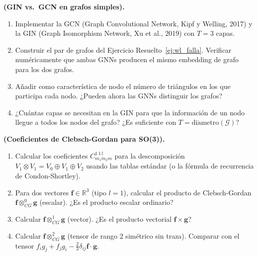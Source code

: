 \begin{ejercicio}
\textbf{(GIN vs.\ GCN en grafos simples).}
\begin{enumerate}[label=(\alph*)]
  \item Implementar la GCN (Graph Convolutional Network, Kipf y Welling, 2017)
        y la GIN (Graph Isomorphism Network, Xu et al., 2019) con $T=3$ capas.
  \item Construir el par de grafos del Ejercicio Resuelto~\ref{ej:wl_falla}.
        Verificar numéricamente que ambas GNNs producen el mismo embedding
        de grafo para los dos grafos.
  \item Añadir como característica de nodo el número de triángulos en los
        que participa cada nodo. ¿Pueden ahora las GNNs distinguir los grafos?
  \item ¿Cuántas capas se necesitan en la GIN para que la información de
        un nodo llegue a todos los nodos del grafo? ¿Es suficiente con
        $T = \mathrm{di\acute{a}metro}(\mathcal{G})$?
\end{enumerate}
\end{ejercicio}

\begin{ejercicio}
\textbf{(Coeficientes de Clebsch-Gordan para SO(3)).}
\begin{enumerate}[label=(\alph*)]
  \item Calcular los coeficientes $C_{m_1 m_2 m}^{1\,1\,l}$ para la
        descomposición $V_1 \otimes V_1 = V_0 \oplus V_1 \oplus V_2$
        usando las tablas estándar (o la fórmula de recurrencia de
        Condon-Shortley).
  \item Para dos vectores $\bm{f} \in \mathbb{R}^3$ (tipo $l=1$),
        calcular el producto de Clebsch-Gordan $\bm{f} \otimes_{CG}^0 \bm{g}$
        (escalar). ¿Es el producto escalar ordinario?
  \item Calcular $\bm{f} \otimes_{CG}^1 \bm{g}$ (vector). ¿Es el producto
        vectorial $\bm{f}\times\bm{g}$?
  \item Calcular $\bm{f} \otimes_{CG}^2 \bm{g}$ (tensor de rango 2 simétrico
        sin traza). Comparar con el tensor $f_i g_j + f_j g_i - \frac{2}{3}
        \delta_{ij}\bm{f}\cdot\bm{g}$.
\end{enumerate}
\end{ejercicio}

